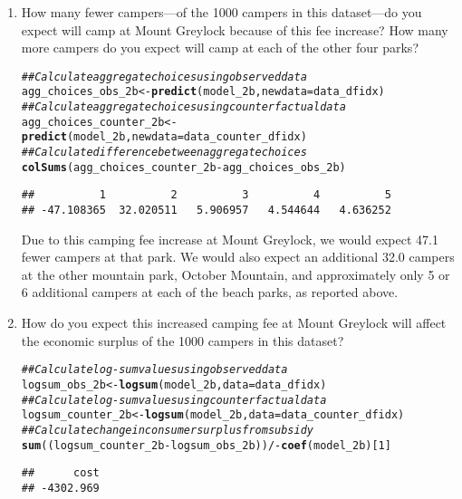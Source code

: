 \documentclass[11pt,letterpaper]{article}\usepackage[]{graphicx}\usepackage[]{xcolor}
\makeatletter
\newcommand{\hlnum}[1]{\textcolor[rgb]{0.686,0.059,0.569}{#1}}%
\newcommand{\hlcom}[1]{\textcolor[rgb]{0.678,0.584,0.686}{\textit{#1}}}%
\newcommand{\hlopt}[1]{\textcolor[rgb]{0,0,0}{#1}}%
\newcommand{\hlstd}[1]{\textcolor[rgb]{0.345,0.345,0.345}{#1}}%
\newcommand{\hlkwb}[1]{\textcolor[rgb]{0.69,0.353,0.396}{#1}}%
\newcommand{\hlkwc}[1]{\textcolor[rgb]{0.333,0.667,0.333}{#1}}%
\newcommand{\hlkwd}[1]{\textcolor[rgb]{0.737,0.353,0.396}{\textbf{#1}}}%
\newenvironment{kframe}{%
 \def\at@end@of@kframe{}%
 \ifinner\ifhmode%
  \def\at@end@of@kframe{\end{minipage}}%
  \begin{minipage}{\columnwidth}%
 \fi\fi%
 \def\FrameCommand##1{\hskip\@totalleftmargin \hskip-\fboxsep
 \colorbox{shadecolor}{##1}\hskip-\fboxsep
     \hskip-\linewidth \hskip-\@totalleftmargin \hskip\columnwidth}%
 \MakeFramed {\advance\hsize-\width
   \@totalleftmargin\z@ \linewidth\hsize
   \@setminipage}}%
 {\par\unskip\endMakeFramed%
 \at@end@of@kframe}
\newenvironment{knitrout}{}{} %
\makeatother
\begin{document}
\begin{enumerate}[label=\alph*., leftmargin=*]
	\begin{enumerate}[label=\roman*.]
		\item How many fewer campers---of the 1000 campers in this dataset---do you expect will camp at Mount Greylock because of this fee increase? How many more campers do you expect will camp at each of the other four parks?

\begin{knitrout}
\color{fgcolor}\begin{kframe}
\begin{alltt}
\hlcom{## Calculate aggregate choices using observed data}
\hlstd{agg_choices_obs_2b} \hlkwb{<-} \hlkwd{predict}\hlstd{(model_2b,} \hlkwc{newdata} \hlstd{= data_dfidx)}
\hlcom{## Calculate aggregate choices using counterfactual data}
\hlstd{agg_choices_counter_2b} \hlkwb{<-} \hlkwd{predict}\hlstd{(model_2b,} \hlkwc{newdata} \hlstd{= data_counter_dfidx)}
\hlcom{## Calculate difference between aggregate choices}
\hlkwd{colSums}\hlstd{(agg_choices_counter_2b} \hlopt{-} \hlstd{agg_choices_obs_2b)}
\end{alltt}
\begin{verbatim}
##          1          2          3          4          5 
## -47.108365  32.020511   5.906957   4.544644   4.636252
\end{verbatim}
\end{kframe}
\end{knitrout}

		Due to this camping fee increase at Mount Greylock, we would expect 47.1 fewer campers at that park. We would also expect an additional 32.0 campers at the other mountain park, October Mountain, and approximately only 5 or 6 additional campers at each of the beach parks, as reported above.

		\item How do you expect this increased camping fee at Mount Greylock will affect the economic surplus of the 1000 campers in this dataset?

\begin{knitrout}
\color{fgcolor}\begin{kframe}
\begin{alltt}
\hlcom{## Calculate log-sum values using observed data}
\hlstd{logsum_obs_2b} \hlkwb{<-} \hlkwd{logsum}\hlstd{(model_2b,} \hlkwc{data} \hlstd{= data_dfidx)}
\hlcom{## Calculate log-sum values using counterfactual data}
\hlstd{logsum_counter_2b} \hlkwb{<-} \hlkwd{logsum}\hlstd{(model_2b,} \hlkwc{data} \hlstd{= data_counter_dfidx)}
\hlcom{## Calculate change in consumer surplus from subsidy}
\hlkwd{sum}\hlstd{((logsum_counter_2b} \hlopt{-} \hlstd{logsum_obs_2b))} \hlopt{/ -}\hlkwd{coef}\hlstd{(model_2b)[}\hlnum{1}\hlstd{]}
\end{alltt}
\begin{verbatim}
##      cost 
## -4302.969
\end{verbatim}
\end{kframe}
\end{knitrout}


\end{enumerate}
\end{enumerate}
\end{document}
